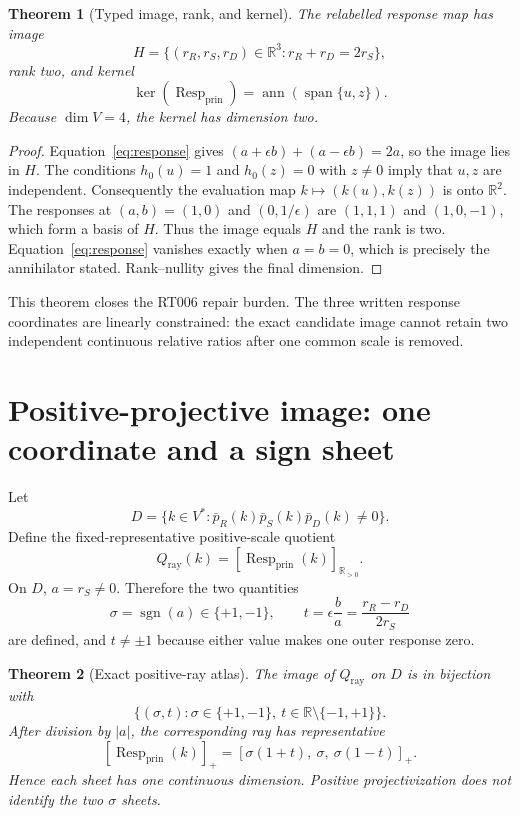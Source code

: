 \documentclass[11pt]{article}
\newtheorem{theorem}{Theorem}
\newcommand{\RR}{\mathbb R}
\newcommand{\Resp}{\operatorname{Resp}_{\mathrm{prin}}}
\newcommand{\Qray}{Q_{\mathrm{ray}}}
\newcommand{\ann}{\operatorname{ann}}
\newcommand{\sgn}{\operatorname{sgn}}
\begin{document}
\begin{theorem}[Typed image, rank, and kernel]\label{thm:image}
The relabelled response map has image
\[
 H=\{(r_R,r_S,r_D)\in\RR^3:r_R+r_D=2r_S\},
\]
rank two, and kernel
\[
 \ker(\Resp)=\ann(\operatorname{span}\{u,z\}).
\]
Because $\dim V=4$, the kernel has dimension two.
\end{theorem}

\begin{proof}
Equation~\eqref{eq:response} gives
$(a+\epsilon b)+(a-\epsilon b)=2a$, so the image lies in $H$.
The conditions $h_0(u)=1$ and $h_0(z)=0$ with $z\ne0$ imply that $u,z$ are
independent.  Consequently the evaluation map
$k\mapsto(k(u),k(z))$ is onto $\RR^2$.  The responses at $(a,b)=(1,0)$ and
$(0,1/\epsilon)$ are $(1,1,1)$ and $(1,0,-1)$, which form a basis of $H$.
Thus the image equals $H$ and the rank is two.  Equation~\eqref{eq:response}
vanishes exactly when $a=b=0$, which is precisely the annihilator stated.
Rank--nullity gives the final dimension.
\end{proof}

This theorem closes the RT006 repair burden.  The three written response
coordinates are linearly constrained: the exact candidate image cannot retain
two independent continuous relative ratios after one common scale is removed.

\section{Positive-projective image: one coordinate and a sign sheet}

Let
\[
 D=\{k\in V^*: \bar p_R(k)\bar p_S(k)\bar p_D(k)\ne0\}.
\]
Define the fixed-representative positive-scale quotient
\[
 \Qray(k)=[\Resp(k)]_{\RR_{>0}}.
\]
On $D$, $a=r_S\ne0$.  Therefore the two quantities
\[
 \sigma=\sgn(a)\in\{+1,-1\},
 \qquad
 t=\epsilon\frac{b}{a}
   =\frac{r_R-r_D}{2r_S}
\]
are defined, and $t\ne\pm1$ because either value makes one outer response
zero.

\begin{theorem}[Exact positive-ray atlas]\label{thm:ray}
The image of $\Qray$ on $D$ is in bijection with
\[
 \{(\sigma,t):\sigma\in\{+1,-1\},\ t\in\RR\setminus\{-1,+1\}\}.
\]
After division by $|a|$, the corresponding ray has representative
\begin{equation}\label{eq:ray}
 [\Resp(k)]_+
   =[\sigma(1+t),\ \sigma,\ \sigma(1-t)]_+.
\end{equation}
Hence each sheet has one continuous dimension.  Positive projectivization does
not identify the two $\sigma$ sheets.
\end{theorem}
\end{document}
